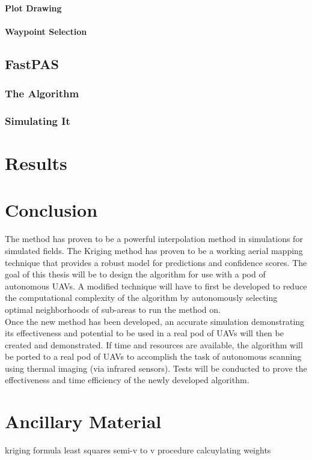 \documentclass[11pt]{ucthesis}
\begin{document}
\subsubsection{Plot Drawing}
\subsubsection{Waypoint Selection}

\section{FastPAS}
\subsection{The Algorithm}
\subsection{Simulating It}

\chapter{Results}

\chapter{Conclusion}
The method has proven to be a powerful interpolation method in simulations for simulated fields. The Kriging method has proven to be a working aerial mapping technique that provides a robust model for predictions and confidence scores. The goal of this thesis will be to design the algorithm for use with a pod of autonomous UAVs. A modified technique will have to first be developed to reduce the computational complexity of the algorithm by autonomously selecting optimal neighborhoods of sub-areas to run the method on.\\
Once the new method has been developed, an accurate simulation demonstrating its effectiveness and potential to be used in a real pod of UAVs will then be created and demonstrated. 
If time and resources are available, the algorithm will be ported to a real pod of UAVs to accomplish the task of autonomous scanning using thermal imaging (via infrared sensors). Tests will be conducted to prove the effectiveness and time efficiency of the newly developed algorithm.

\nocite{*}



\appendix
\chapter{Ancillary Material}
kriging formula
least squares
semi-v to v procedure
calcuylating weights
\end{document}
